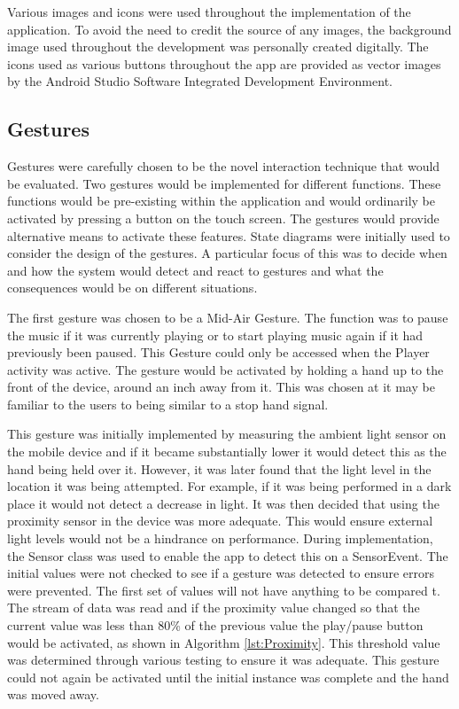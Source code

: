 \documentclass{l4proj}
\begin{document}
Various images and icons were used throughout the implementation of the application. To avoid the need to credit the source of any images, the background image used throughout the development was personally created digitally. The icons used as various buttons throughout the app are provided as vector images by the Android Studio Software Integrated Development Environment.


\subsection{Gestures}

Gestures were carefully chosen to be the novel interaction technique that would be evaluated. Two gestures would be implemented for different functions. These functions would be pre-existing within the application and would ordinarily be activated by pressing a button on the touch screen. The gestures would provide alternative means to activate these features. State diagrams were initially used to consider the design of the gestures. A particular focus of this was to decide when and how the system would detect and react to gestures and what the consequences would be on different situations. 

The first gesture was chosen to be a Mid-Air Gesture. The function was to pause the music if it was currently playing or to start playing music again if it had previously been paused. This Gesture could only be accessed when the Player activity was active. The gesture would be activated by holding a hand up to the front of the device, around an inch away from it. This was chosen at it may be familiar to the users to being similar to a stop hand signal. 

This gesture was initially implemented by measuring the ambient light sensor on the mobile device and if it became substantially lower it would detect this as the hand being held over it. However, it was later found that the light level in the location it was being attempted. For example, if it was being performed in a dark place it would not detect a decrease in light. It was then decided that using the proximity sensor in the device was more adequate. This would ensure external light levels would not be a hindrance on performance. During implementation, the Sensor class was used to enable the app to detect this on a SensorEvent. The initial values were not checked to see if a gesture was detected to ensure errors were prevented. The first set of values will not have anything to be compared t. The stream of data was read and if the proximity value changed so that the current value was less than 80\% of the previous value the play/pause button would be activated, as shown in Algorithm \ref{lst:Proximity}. This threshold value was determined through various testing to ensure it was adequate. This gesture could not again be activated until the initial instance was complete and the hand was moved away.
\end{document}
